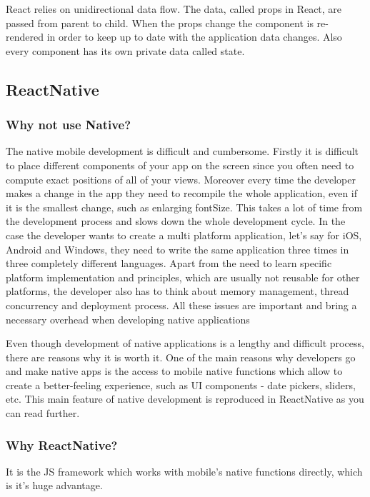 \documentclass[thesis=M,english]{FITthesis}[2012/10/20]
\begin{document}
React relies on unidirectional data flow. The data, called props in React, are passed from parent to child. When the props change the component is re-rendered in order to keep up to date with the application data changes. Also every component has its own private data called state. \cite{react-ant}\cite{react-fb-native}\cite{react-telerik}

\subsection{ReactNative}

\subsubsection{Why not use Native?}
The native mobile development is difficult and cumbersome. Firstly it is difficult to place different components of your app on the screen since you often need to compute exact positions of all of your views. Moreover every time the developer makes a change in the app they need to recompile the whole application, even if it is the smallest change, such as enlarging fontSize. This takes a lot of time from the development process and slows down the whole development cycle. In the case the developer wants to create a multi platform application, let's say for iOS, Android and Windows, they need to write the same application three times in three completely different languages. Apart from the need to learn specific platform implementation and principles, which are usually not reusable for other platforms, the developer also has to think about memory management, thread concurrency and deployment process. All these issues are important and bring a necessary overhead when developing native applications

Even though development of native applications is a lengthy and difficult process, there are reasons why it is worth it. One of the main reasons why developers go and make native apps is the access to mobile native functions which allow to create a better-feeling experience, such as UI components - date pickers, sliders, etc. This main feature of native development is reproduced in ReactNative as you can read further.\cite{react-fb-native}

\subsubsection{Why ReactNative?}

It is the JS framework which works with mobile's native functions directly, which is it's huge advantage.
\end{document}
